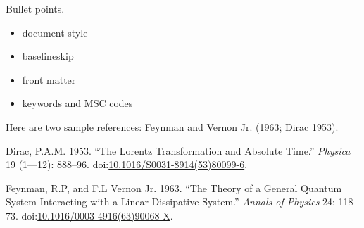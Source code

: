 \documentclass[]{elsarticle} %
\begin{document}
Bullet points.

\begin{itemize}
\item
  document style
\item
  baselineskip
\item
  front matter
\item
  keywords and MSC codes
\end{itemize}

Here are two sample references: Feynman and Vernon Jr. (1963; Dirac
1953).

\hypertarget{refs}{}
\hypertarget{ref-Dirac1953888}{}
Dirac, P.A.M. 1953. ``The Lorentz Transformation and Absolute Time.''
\emph{Physica} 19 (1---12): 888--96.
doi:\href{https://doi.org/10.1016/S0031-8914(53)80099-6}{10.1016/S0031-8914(53)80099-6}.

\hypertarget{ref-Feynman1963118}{}
Feynman, R.P, and F.L Vernon Jr. 1963. ``The Theory of a General Quantum
System Interacting with a Linear Dissipative System.'' \emph{Annals of
Physics} 24: 118--73.
doi:\href{https://doi.org/10.1016/0003-4916(63)90068-X}{10.1016/0003-4916(63)90068-X}.
\end{document}
